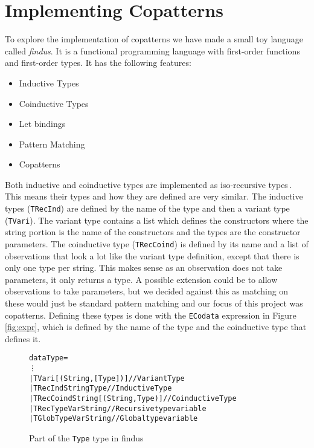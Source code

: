 \section{Implementing Copatterns}
\label{sec:implementing-copatterns}
To explore the implementation of copatterns we have made a small toy language called \textit{findus}. It is a functional programming language with first-order functions and first-order types. It has the following features:

\begin{itemize}
\item Inductive Types
\item Coinductive Types
\item Let bindings
\item Pattern Matching 
\item Copatterns
\end{itemize}

Both inductive and coinductive types are implemented as iso-recursive types\,\cite[p. 275]{Pierce:2002:TPL:509043}. This means their types and how they are defined are very similar. The inductive types (\texttt{TRecInd}) are defined by the name of the type and then a variant type (\texttt{TVari}). The variant type contains a list which defines the constructors where the string portion is the name of the constructors and the types are the constructor parameters. The coinductive type (\texttt{TRecCoind}) is defined by its name and a list of observations that look a lot like the variant type definition, except that there is only one type per string. This makes sense as an observation does not take parameters, it only returns a type. A possible extension could be to allow observations to take parameters, but we decided against this as matching on these would just be standard pattern matching and our focus of this project was copatterns. Defining these types is done with the \texttt{ECodata} expression in Figure \ref{fig:expr}, which is defined by the name of the type and the coinductive type that defines it.

\begin{figure}
\begin{alltt}
data Type =
  \vdots
  | TVari [(String, [Type])]          // Variant Type
  | TRecInd String Type               // Inductive Type
  | TRecCoind String [(String, Type)] // Coinductive Type
  | TRecTypeVar String                // Recursive type variable
  | TGlobTypeVar String               // Global type variable
\end{alltt}
\caption{Part of the \texttt{Type} type in findus}
\label{fig:types}
\end{figure}

